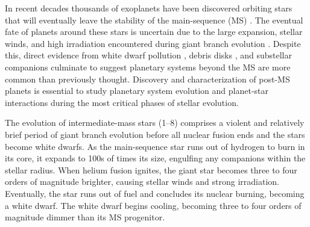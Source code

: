 \documentclass[twocolumn]{aastex631}
\begin{document}
In recent decades thousands of exoplanets have been discovered orbiting stars that will eventually leave the stability of the main-sequence (MS) \citep{akesonNASAExoplanetArchive2013}. The eventual fate of planets around these stars is uncertain due to the large expansion, stellar winds, and high irradiation encountered during giant branch evolution \citep{verasPostmainsequencePlanetarySystem2016}. Despite this, direct evidence from white dwarf pollution \citep{juraExternallyPollutedWhite2007,xuSpitzerObservationsWhite2012}, debris disks \citep{deruyterKeplerianDiscsPostAGB2006,zuckermanAncientPlanetarySystems2010,koesterFrequencyPlanetaryDebris2014}, and substellar companions \citep[e.g.,][]{luhmanDiscoveryCandidateCoolest2011,vanderburgGiantPlanetCandidate2020,blackmanJovianAnalogueOrbiting2021} culminate to suggest planetary systems beyond the MS are more common than previously thought. Discovery and characterization of post-MS planets is essential to study planetary system evolution and planet-star interactions during the most critical phases of stellar evolution.

The evolution of intermediate-mass stars (\qtyrange{1}{8}{\solarmass}) comprises a violent and relatively brief period of giant branch evolution before all nuclear fusion ends and the stars become white dwarfs. As the main-sequence star runs out of hydrogen to burn in its core, it expands to 100s of times its size, engulfing any companions within the stellar radius. When helium fusion ignites, the giant star becomes three to four orders of magnitude brighter, causing stellar winds and strong irradiation. Eventually, the star runs out of fuel and concludes its nuclear burning, becoming a white dwarf. The white dwarf begins cooling, becoming three to four orders of magnitude dimmer than its MS progenitor.
\end{document}
